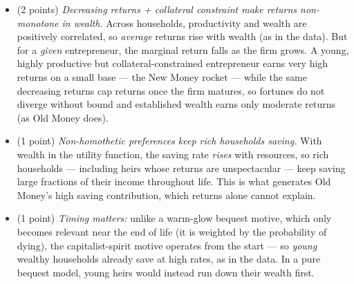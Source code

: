 \begin{parts}
    \begin{solutionorbox}[12cm]
        \begin{itemize}
            \item (2 points) \emph{Decreasing returns + collateral constraint make returns non-monotone in wealth.} Across households, productivity and wealth are positively correlated, so \emph{average} returns rise with wealth (as in the data). But for a \emph{given} entrepreneur, the marginal return falls as the firm grows. A young, highly productive but collateral-constrained entrepreneur earns very high returns on a small base — the New Money rocket — while the same decreasing returns cap returns once the firm matures, so fortunes do not diverge without bound and established wealth earns only moderate returns (as Old Money does).
            \item (1 point) \emph{Non-homothetic preferences keep rich households saving.} With wealth in the utility function, the saving rate \emph{rises} with resources, so rich households — including heirs whose returns are unspectacular — keep saving large fractions of their income throughout life. This is what generates Old Money's high saving contribution, which returns alone cannot explain.
            \item (1 point) \emph{Timing matters:} unlike a warm-glow bequest motive, which only becomes relevant near the end of life (it is weighted by the probability of dying), the capitalist-spirit motive operates from the start — so \emph{young} wealthy households already save at high rates, as in the data. In a pure bequest model, young heirs would instead run down their wealth first.
        \end{itemize}
    \end{solutionorbox}
\end{parts}
